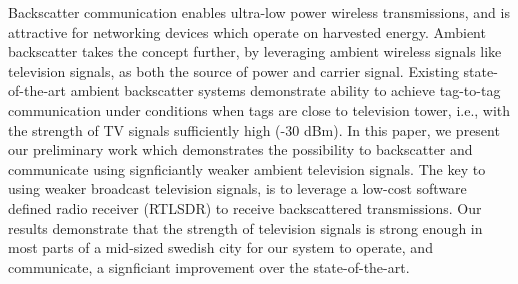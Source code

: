Backscatter communication enables ultra-low
power wireless transmissions, and is attractive
for networking devices which operate 
on harvested energy. Ambient backscatter
takes the concept further, by leveraging
ambient wireless signals like
television signals, as both the source of power
and carrier signal. Existing state-of-the-art ambient backscatter
systems demonstrate ability to achieve tag-to-tag communication 
under conditions when tags are close to television tower, i.e., with the
strength of TV signals  sufficiently high (-30 dBm).  In this paper, we present our preliminary work
which demonstrates the possibility to backscatter and communicate using signficiantly weaker 
ambient television signals. The key to using weaker broadcast television signals, is to leverage a low-cost
software defined radio receiver (RTLSDR) to receive backscattered transmissions. Our results 
demonstrate that the strength of television signals is strong 
enough in most parts of a mid-sized swedish city for our system
to operate, and communicate, a signficiant improvement over the
state-of-the-art.
